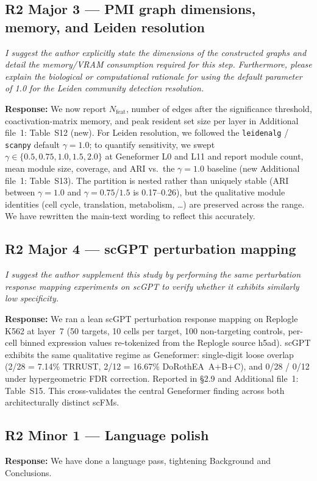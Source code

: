 \documentclass[11pt]{article}
\newcommand{\reviewercomment}[1]{\textit{\color{gray}#1}}
\newcommand{\response}[1]{\textbf{Response:} #1}
\begin{document}
\subsection*{R2 Major 3 --- PMI graph dimensions, memory, and Leiden resolution}
\reviewercomment{I suggest the author explicitly state the dimensions of the constructed graphs and detail the memory/VRAM consumption required for this step. Furthermore, please explain the biological or computational rationale for using the default parameter of 1.0 for the Leiden community detection resolution.}

\response{We now report $N_\text{feat}$, number of edges after the significance threshold, coactivation-matrix memory, and peak resident set size per layer in Additional file~1: Table~S12 (new). For Leiden resolution, we followed the \texttt{leidenalg} / \texttt{scanpy} default $\gamma{=}1.0$; to quantify sensitivity, we swept $\gamma \in \{0.5, 0.75, 1.0, 1.5, 2.0\}$ at Geneformer L0 and L11 and report module count, mean module size, coverage, and ARI vs.\ the $\gamma{=}1.0$ baseline (new Additional file~1: Table~S13). The partition is nested rather than uniquely stable (ARI between $\gamma{=}1.0$ and $\gamma{=}0.75$/$1.5$ is 0.17--0.26), but the qualitative module identities (cell cycle, translation, metabolism, \ldots) are preserved across the range. We have rewritten the main-text wording to reflect this accurately.}

\subsection*{R2 Major 4 --- scGPT perturbation mapping}
\reviewercomment{I suggest the author supplement this study by performing the same perturbation response mapping experiments on scGPT to verify whether it exhibits similarly low specificity.}

\response{We ran a lean scGPT perturbation response mapping on Replogle K562 at layer~7 (50 targets, 10 cells per target, 100 non-targeting controls, per-cell binned expression values re-tokenized from the Replogle source h5ad). scGPT exhibits the same qualitative regime as Geneformer: single-digit loose overlap (2/28 = 7.14\% TRRUST, 2/12 = 16.67\% DoRothEA~A+B+C), and 0/28 / 0/12 under hypergeometric FDR correction. Reported in \S2.9 and Additional file~1: Table~S15. This cross-validates the central Geneformer finding across both architecturally distinct scFMs.}

\subsection*{R2 Minor 1 --- Language polish}
\response{We have done a language pass, tightening Background and Conclusions.}
\end{document}
